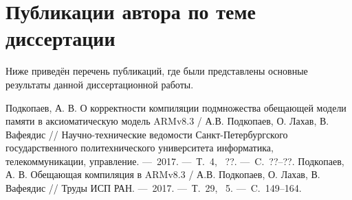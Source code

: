 





\section*{\LARGE Публикации автора по теме диссертации}

Ниже приведён перечень публикаций, где были представлены основные результаты данной  диссертационной работы. \\

\renewcommand{\bibsection}{\noindent \textbf{\refname}}

\renewcommand{\refname}{Статьи из \vakJournals}
\begin{thebibliography}{99}
 Подкопаев, А. В. О корректности компиляции подмножества обещающей модели памяти в аксиоматическую модель ARMv8.3 / А.В. Подкопаев, О. Лахав, В. Вафеядис // Научно-технические ведомости Санкт-Петербургского государственного политехнического университета информатика, телекоммуникации, управление. ---~2017. ---~Т.~4, \textnumero~??. ---~C.~??--??.
 Подкопаев, А. В. Обещающая компиляция в ARMv8.3 / А.В. Подкопаев, О. Лахав, В. Вафеядис // Труды ИСП РАН. ---~2017. ---~Т.~29, \textnumero~5. ---~C.~149--164.
\setcounter{firstbib}{\value{enumiv}}
\end{thebibliography}

